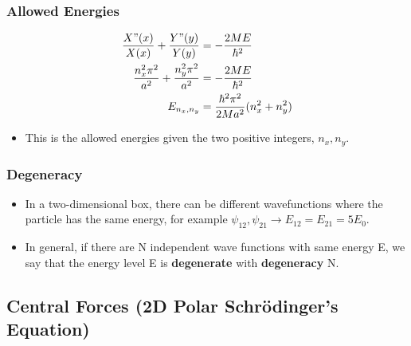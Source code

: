 \documentclass[12pt, letterpaper, twoside]{article}
\begin{document}
\subsubsection{Allowed Energies}

\begin{align*}
    \frac{X"(x)}{X(x)} + \frac{Y"(y)}{Y(y)} &= -\frac{2ME}{\hbar^2} \\
    \frac{n_x^2\pi^2}{a^2} + \frac{n_y^2\pi^2}{a^2} &= -\frac{2ME}{\hbar^2} \\
    E_{n_x,n_y} &= \frac{\hbar^2\pi^2}{2Ma^2}(n_x^2 + n_y^2)
\end{align*}

\begin{itemize}
    \item This is the allowed energies given the two positive integers, $n_x, n_y$.
\end{itemize}
\subsubsection{Degeneracy}

\begin{itemize}
    \item In a two-dimensional box, there can be different wavefunctions where the particle has the same energy, for example $\psi_{12}, \psi_{21} \longrightarrow E_{12} = E_{21} = 5E_0$.
    \item In general, if there are N independent wave functions with same energy E, we say that the energy level E is \textbf{degenerate} with \textbf{degeneracy} N.
\end{itemize}

\subsection{Central Forces (2D Polar Schr\"{o}dinger's Equation)}
\end{document}
